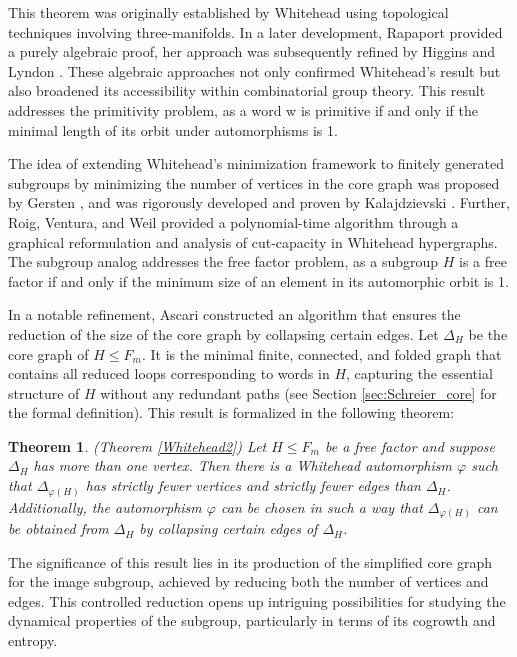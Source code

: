 \documentclass{article}
\newtheorem{introthm}{Theorem}
\begin{document}
This theorem was originally established by Whitehead using topological techniques involving three-manifolds. In a later development, Rapaport \cite{Rapaport} provided a purely algebraic proof, her approach was subsequently refined by Higgins and Lyndon \cite{HL1974}. These algebraic approaches not only confirmed Whitehead’s result but also broadened its accessibility within combinatorial group theory. This result addresses the primitivity problem, as a word w is primitive if and only if the minimal length of its orbit under automorphisms is 1.

The idea of extending Whitehead's minimization framework to finitely generated subgroups by minimizing the number of vertices in the core graph was proposed by Gersten \cite{Gersten1984}, and was rigorously developed and proven by Kalajdzievski \cite{Saso1992}. Further, Roig, Ventura, and Weil \cite{RVW2007} provided a polynomial-time algorithm through a graphical reformulation and analysis of cut-capacity in Whitehead hypergraphs. The subgroup analog addresses the free factor problem, as a subgroup $H$ is a free factor if and only if the minimum size of an element in its automorphic orbit is 1.

In a notable refinement, Ascari \cite{ascari2021fine} constructed an algorithm that ensures the reduction of the size of the core graph by collapsing certain edges. Let $\Delta_H$ be the core graph of $H \leq F_m$. It is the minimal finite, connected, and folded graph that contains all reduced loops corresponding to words in $H$, capturing the essential structure of $H$ without any redundant paths (see Section \ref{sec:Schreier_core} for the formal definition).  This result is formalized in the following theorem:

\begin{introthm}\label{introascari} \textnormal{(Theorem \ref{Whitehead2}) }
Let $H \leq F_m$ be a free factor and suppose $\Delta_H$ has more than one vertex. Then there is a Whitehead automorphism $\varphi$ such that $\Delta_{\varphi(H)}$ has strictly fewer vertices and strictly fewer edges than $\Delta_H$. Additionally, the automorphism $\varphi$ can be chosen in such a way that $\Delta_{\varphi(H)}$ can be obtained from $\Delta_H$ by collapsing certain edges of $\Delta_H$.
\end{introthm}

The significance of this result lies in its production of the simplified core graph for the image subgroup, achieved by reducing both the number of vertices and edges. This controlled reduction opens up intriguing possibilities for studying the dynamical properties of the subgroup, particularly in terms of its cogrowth and entropy.
\end{document}
